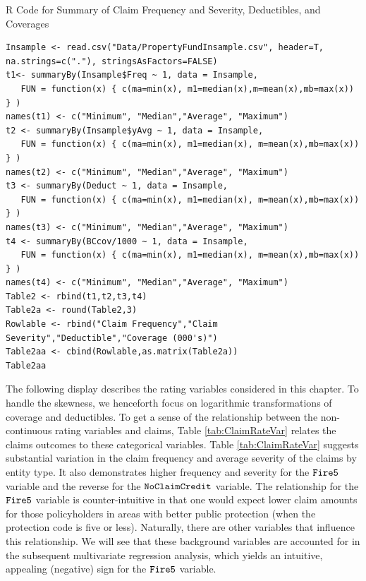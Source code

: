 \documentclass[]{book}
\theoremstyle{definition}
\theoremstyle{definition}
\theoremstyle{definition}
\theoremstyle{remark}
\begin{document}
R Code for Summary of Claim Frequency and Severity, Deductibles, and
Coverages

\hypertarget{display.DeductCov.2}{}
\begin{verbatim}
Insample <- read.csv("Data/PropertyFundInsample.csv", header=T, na.strings=c("."), stringsAsFactors=FALSE)
t1<- summaryBy(Insample$Freq ~ 1, data = Insample, 
   FUN = function(x) { c(ma=min(x), m1=median(x),m=mean(x),mb=max(x)) } )
names(t1) <- c("Minimum", "Median","Average", "Maximum")
t2 <- summaryBy(Insample$yAvg ~ 1, data = Insample, 
   FUN = function(x) { c(ma=min(x), m1=median(x), m=mean(x),mb=max(x)) } )
names(t2) <- c("Minimum", "Median","Average", "Maximum")
t3 <- summaryBy(Deduct ~ 1, data = Insample, 
   FUN = function(x) { c(ma=min(x), m1=median(x), m=mean(x),mb=max(x)) } )
names(t3) <- c("Minimum", "Median","Average", "Maximum")
t4 <- summaryBy(BCcov/1000 ~ 1, data = Insample, 
   FUN = function(x) { c(ma=min(x), m1=median(x), m=mean(x),mb=max(x)) } )
names(t4) <- c("Minimum", "Median","Average", "Maximum")
Table2 <- rbind(t1,t2,t3,t4)
Table2a <- round(Table2,3)
Rowlable <- rbind("Claim Frequency","Claim Severity","Deductible","Coverage (000's)")
Table2aa <- cbind(Rowlable,as.matrix(Table2a))
Table2aa
\end{verbatim}

The following display describes the rating variables considered in this
chapter. To handle the skewness, we henceforth focus on logarithmic
transformations of coverage and deductibles. To get a sense of the
relationship between the non-continuous rating variables and claims,
Table \ref{tab:ClaimRateVar} relates the claims outcomes to these
categorical variables. Table \ref{tab:ClaimRateVar} suggests substantial
variation in the claim frequency and average severity of the claims by
entity type. It also demonstrates higher frequency and severity for the
\({\tt Fire5}\) variable and the reverse for the \({\tt NoClaimCredit}\)
variable. The relationship for the \({\tt Fire5}\) variable is
counter-intuitive in that one would expect lower claim amounts for those
policyholders in areas with better public protection (when the
protection code is five or less). Naturally, there are other variables
that influence this relationship. We will see that these background
variables are accounted for in the subsequent multivariate regression
analysis, which yields an intuitive, appealing (negative) sign for the
\({\tt Fire5}\) variable.
\end{document}
